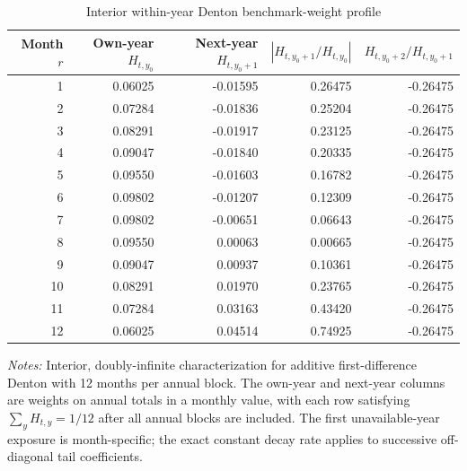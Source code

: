 \begin{table}[htbp]
\centering\scriptsize
\caption{Interior within-year Denton benchmark-weight profile}
\label{tab:s_denton_profile}
\begin{tabular}{rrrrr}
\toprule
Month $r$ & Own-year $H_{t,y_0}$ & Next-year $H_{t,y_0+1}$ & $|H_{t,y_0+1}/H_{t,y_0}|$ & $H_{t,y_0+2}/H_{t,y_0+1}$ \\
\midrule
1  & 0.06025 & -0.01595 & 0.26475 & -0.26475 \\
2  & 0.07284 & -0.01836 & 0.25204 & -0.26475 \\
3  & 0.08291 & -0.01917 & 0.23125 & -0.26475 \\
4  & 0.09047 & -0.01840 & 0.20335 & -0.26475 \\
5  & 0.09550 & -0.01603 & 0.16782 & -0.26475 \\
6  & 0.09802 & -0.01207 & 0.12309 & -0.26475 \\
7  & 0.09802 & -0.00651 & 0.06643 & -0.26475 \\
8  & 0.09550 &  0.00063 & 0.00665 & -0.26475 \\
9  & 0.09047 &  0.00937 & 0.10361 & -0.26475 \\
10 & 0.08291 &  0.01970 & 0.23765 & -0.26475 \\
11 & 0.07284 &  0.03163 & 0.43420 & -0.26475 \\
12 & 0.06025 &  0.04514 & 0.74925 & -0.26475 \\
\bottomrule
\end{tabular}
\begin{singlespace}\footnotesize\textit{Notes:} Interior, doubly-infinite characterization for additive first-difference Denton with 12 months per annual block. The own-year and next-year columns are weights on annual totals in a monthly value, with each row satisfying $\sum_y H_{t,y}=1/12$ after all annual blocks are included. The first unavailable-year exposure is month-specific; the exact constant decay rate applies to successive off-diagonal tail coefficients.\end{singlespace}
\end{table}
